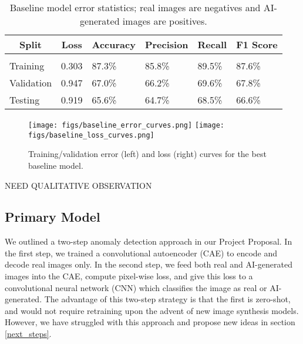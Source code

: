 \documentclass{article} %
\begin{document}
\begin{table}[t]
    \caption{Baseline model error statistics; real images are negatives and AI-generated images are positives.}
    \label{baseline_stats}
    \begin{center}
        \begin{tabular}{llllll}
            \multicolumn{1}{c}{\bf Split} & \multicolumn{1}{c}{\bf Loss} & \multicolumn{1}{c}{\bf Accuracy} & \multicolumn{1}{c}{\bf Precision} & \multicolumn{1}{c}{\bf Recall} & \multicolumn{1}{c}{\bf F1 Score}
            \\ \hline \\
            Training                      & 0.303                        & 87.3\%                           & 85.8\%                            & 89.5\%                         & 87.6\%                           \\
            Validation                    & 0.947                        & 67.0\%                           & 66.2\%                            & 69.6\%                         & 67.8\%                           \\
            Testing                       & 0.919                        & 65.6\%                           & 64.7\%                            & 68.5\%                         & 66.6\%                           \\
        \end{tabular}
    \end{center}
\end{table}

\begin{figure}[h]
    \label{baseline_curves}
    \begin{center}
        \texttt{[image: figs/baseline\_error\_curves.png]}
        \texttt{[image: figs/baseline\_loss\_curves.png]}
    \end{center}
    \caption{Training/validation error (left) and loss (right) curves for the best baseline model.}
\end{figure}

NEED QUALITATIVE OBSERVATION

\subsection{Primary Model}

We outlined a two-step anomaly detection approach in our Project Proposal. In the first step, we trained a convolutional autoencoder (CAE) to encode and decode real images only. In the second step, we feed both real and AI-generated images into the CAE, compute pixel-wise loss, and give this loss to a convolutional neural network (CNN) which classifies the image as real or AI-generated. The advantage of this two-step strategy is that the first is zero-shot, and would not require retraining upon the advent of new image synthesis models. However, we have struggled with this approach and propose new ideas in section \ref{next_steps}.
\end{document}

